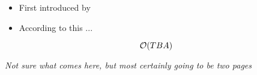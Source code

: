 \begin{itemize}
	\item First introduced by \cite{scholkopf1998nonlinear}
	\item According to this ...%
\end{itemize}

$$\mathcal{O}(TBA)$$

\clearpage

\begin{center}
	\textit{Not sure what comes here, but most certainly going to be two pages}
\end{center}
